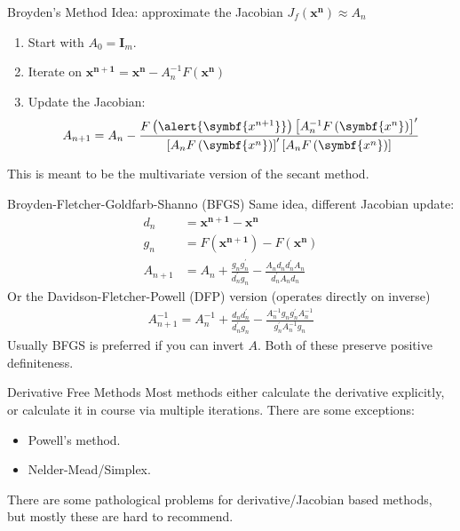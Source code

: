 \documentclass[aspectratio=169,11pt]{beamer}
\begin{document}
\begin{frame}{Broyden's Method}
Idea: approximate the Jacobian $J_f(\symbf{x^n}) \approx A_n$
\begin{enumerate}
\item Start with $A_0 = \symbf{I}_m$.
\item Iterate on $\symbf{x^{n+1}}= \symbf{x^n} - A_n^{-1} F\left(\symbf{x^{n}}\right)$
\item Update the Jacobian:
\begin{align*}
A_{n+1}=A_{n}-\frac{F\left(\alert{\symbf{x^{n+1}}}\right)\left[A_{n}^{-1}  F\left(\symbf{x^{n}}\right) \right]^{\prime}}{\left[A_{n} F\left(\symbf{x^{n}}\right) \right]^{\prime}\left[A_{n} F\left(\symbf{x^{n}}\right) \right]}
\end{align*}
\end{enumerate}
This is meant to be the multivariate version of the \alert{secant method}.
\end{frame} 



\begin{frame}{Broyden-Fletcher-Goldfarb-Shanno (BFGS)}
Same idea, different Jacobian update:
\begin{align*}
d_n &= \symbf{x^{n+1}} - \symbf{x^n} \\
g_n &= F(\symbf{x^{n+1}}) -F(\symbf{x^n}) \\
A_{n+1}&=A_{n}+\frac{g_{n} g_{n}^{\prime}}{d_{n}^{\prime} g_{n}}-\frac{A_{n} d_{n} d_{n}^{\prime} A_{n}}{d_{n}^{\prime} A_{n} d_{n}}
\end{align*}
Or the Davidson-Fletcher-Powell (DFP) version (operates directly on inverse)
\begin{align*}
A_{n+1}^{-1}=A_{n}^{-1}+\frac{d_{n} d_{n}^{\prime}}{d_{n}^{\prime} g_{n}}-\frac{A_{n}^{-1} g_{n} g_{n}^{\prime} A_{n}^{-1}}{g_{n}^{\prime} A_{n}^{-1} g_{n}}
\end{align*}
Usually BFGS is preferred if you can invert $A$. Both of these preserve \alert{positive definiteness}.
\end{frame} 

\begin{frame}{Derivative Free Methods}
Most methods either calculate the derivative explicitly, or calculate it in course via multiple iterations. There are some exceptions:
\begin{itemize}
\item Powell's method.
\item Nelder-Mead/Simplex.
\end{itemize}
There are some pathological problems for derivative/Jacobian based methods, but mostly these are hard to recommend.
\end{frame} 
\end{document}
